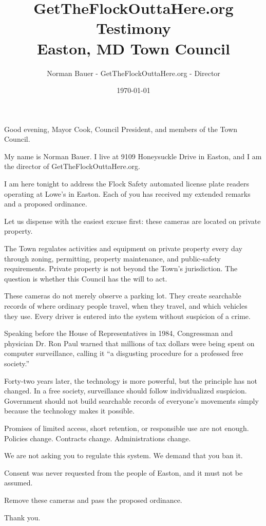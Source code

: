 \documentclass[11pt]{article}
\author{Norman Bauer - GetTheFlockOuttaHere.org - Director}
\date{\today}
\title{GetTheFlockOuttaHere.org Testimony\\\medskip
\large Easton, MD Town Council}
\begin{document}
\maketitle
\setcounter{tocdepth}{2}
\tableofcontents

\RaggedRight


Good evening, Mayor Cook, Council President, and members of the Town Council.

My name is Norman Bauer. I live at 9109 Honeysuckle Drive in Easton, and I am the director of GetTheFlockOuttaHere.org.

I am here tonight to address the Flock Safety automated license plate readers operating at Lowe’s in Easton. Each of you has received my extended remarks and a proposed ordinance.

Let us dispense with the easiest excuse first: these cameras are located on private property.

The Town regulates activities and equipment on private property every day through zoning, permitting, property maintenance, and public-safety requirements. Private property is not beyond the Town’s jurisdiction. The question is whether this Council has the will to act.

These cameras do not merely observe a parking lot. They create searchable records of where ordinary people travel, when they travel, and which vehicles they use. Every driver is entered into the system without suspicion of a crime.

Speaking before the House of Representatives in 1984, Congressman and physician Dr. Ron Paul warned that millions of tax dollars were being spent on computer surveillance, calling it “a disgusting procedure for a professed free society.”

Forty-two years later, the technology is more powerful, but the principle has not changed. In a free society, surveillance should follow individualized suspicion. Government should not build searchable records of everyone’s movements simply because the technology makes it possible.

Promises of limited access, short retention, or responsible use are not enough. Policies change. Contracts change. Administrations change.

We are not asking you to regulate this system. We demand that you ban it.

Consent was never requested from the people of Easton, and it must not be assumed.

Remove these cameras and pass the proposed ordinance.

Thank you.
\end{document}
